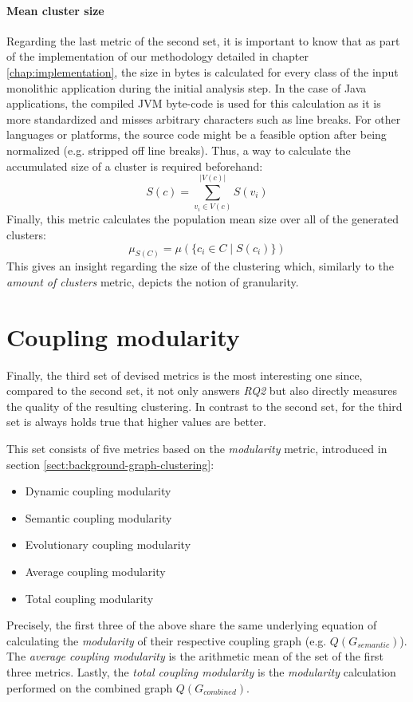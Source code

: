 \documentclass[12pt,a4paper]{report}
\begin{document}
\paragraph{Mean cluster size}
Regarding the last metric of the second set, it is important to know that
as part of the implementation of our methodology detailed in chapter
\ref{chap:implementation}, the size in bytes is calculated for every class
of the input monolithic application during the initial analysis step.
In the case of Java applications, the compiled JVM byte-code is used for this
calculation as it is more standardized and misses arbitrary characters such as
line breaks. For other languages or platforms, the source code might be a
feasible option after being normalized (e.g. stripped off line breaks).
Thus, a way to calculate the accumulated size of a cluster is required beforehand:
\[
  S(c) = \sum_{v_i \in V(c)}^{\vert V(c) \vert} S(v_i)
\]
Finally, this metric calculates the population mean size over all of the
generated clusters:
\[
  \mu_{S(C)} = \mu(\{ c_i \in C \mid S(c_i) \})
\]
This gives an insight regarding the size of the clustering which, similarly to
the \textit{amount of clusters} metric, depicts the notion of granularity.



\section{Coupling modularity}

Finally, the third set of devised metrics is the most interesting one since,
compared to the second set, it not only answers \textit{RQ2} but also directly
measures the quality of the resulting clustering.
In contrast to the second set, for the third set is always holds true that
higher values are better.

This set consists of five metrics based on the \textit{modularity} metric,
introduced in section \ref{sect:background-graph-clustering}:
\begin{itemize}[noitemsep]
  \item Dynamic coupling modularity
  \item Semantic coupling modularity
  \item Evolutionary coupling modularity
  \item Average coupling modularity
  \item Total coupling modularity
\end{itemize}
Precisely, the first three of the above share the same underlying equation
of calculating the \textit{modularity} of their respective coupling graph
(e.g. \(Q(G_{semantic})\)).
The \textit{average coupling modularity} is the arithmetic mean
of the set of the first three metrics.
Lastly, the \textit{total coupling modularity} is the \textit{modularity}
calculation performed on the combined graph \(Q(G_{combined})\).
\end{document}
